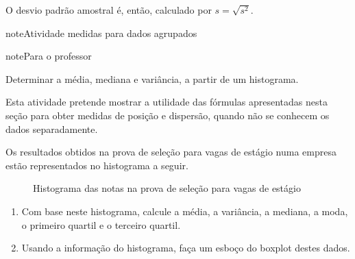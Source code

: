 O desvio padrão amostral é, então, calculado por \(s=\sqrt{s^2}\).
\label{\detokenize{PE104-A:ativ-dadosagrupados}}
\begin{sphinxadmonition}{note}{Atividade}{ medidas para dados agrupados}

\begin{sphinxadmonition}{note}{Para o professor}

 Determinar a média, mediana e variância, a partir de um histograma.

 Esta atividade pretende mostrar a utilidade das fórmulas apresentadas nesta seção para obter medidas de posição e dispersão, quando não se conhecem os dados separadamente.
\end{sphinxadmonition}

Os resultados obtidos na prova de seleção para vagas de estágio numa empresa estão representados no histograma a seguir.
\label{\detokenize{PE104-A:fig-hist-vagas-estagio}}
\begin{figure}[H]
\centering

\noindent{}
\caption{Histograma das notas na prova de seleção para vagas de estágio}
\label{\detokenize{PE104-A:fig-hist-vagas-estagio}}\end{figure}

\begin{enumerate}
\item {} 
Com base neste histograma, calcule a média, a variância, a mediana, a moda, o primeiro quartil e o terceiro quartil.

\item {} 
Usando a informação do histograma, faça um esboço do boxplot destes dados.

\end{enumerate}
\end{sphinxadmonition}

